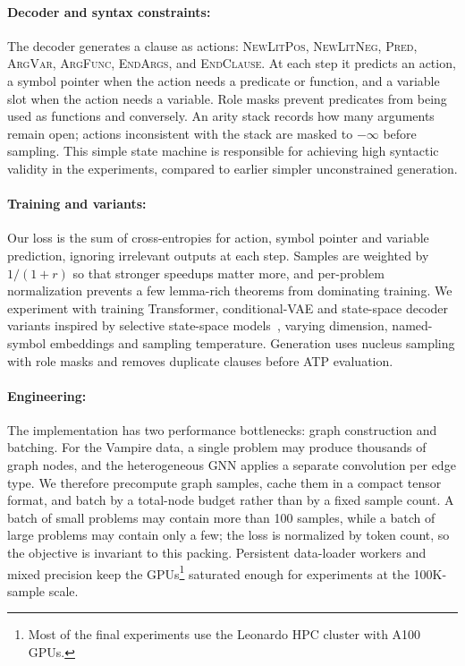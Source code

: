 \documentclass{easychair}
\newcommand{\Vampire}{Vampire\xspace}
\begin{document}
\paragraph{Decoder and syntax constraints:}
The decoder generates a clause as actions:
\textsc{NewLitPos}, \textsc{NewLitNeg}, \textsc{Pred},
\textsc{ArgVar}, \textsc{ArgFunc}, \textsc{EndArgs}, and
\textsc{EndClause}.  At each step it predicts an action, a symbol
pointer when the action needs a predicate or function, and a variable
slot when the action needs a variable.  Role masks prevent predicates
from being used as functions and conversely.  An arity stack records
how many arguments remain open; actions inconsistent with the stack are
masked to $-\infty$ before sampling.  This simple state machine is
responsible for achieving high syntactic validity in the experiments, compared to earlier simpler unconstrained generation.

\paragraph{Training and variants:}
Our loss is the sum of cross-entropies for action, symbol pointer and
variable prediction, ignoring irrelevant outputs at each step.  Samples
are weighted by $1/(1+r)$ so that stronger speedups matter more, and
per-problem normalization prevents a few lemma-rich theorems from
dominating training.  We experiment with training Transformer, conditional-VAE and
state-space decoder variants inspired by selective state-space models~\cite{Gu2023}, varying dimension, named-symbol
embeddings and sampling temperature.  Generation uses nucleus sampling
with role masks and removes duplicate clauses before ATP evaluation.

\paragraph{Engineering:}
The implementation has two performance bottlenecks: graph construction
and batching.  For the \Vampire data, a single problem may produce
thousands of graph nodes, and the heterogeneous GNN applies a separate
convolution per edge type.  We therefore precompute graph samples,
cache them in a compact tensor format, and batch by a total-node budget
rather than by a fixed sample count.  A batch of small problems may
contain more than 100 samples, while a batch of large problems may
contain only a few; the loss is normalized by token count, so the
objective is invariant to this packing.  Persistent data-loader workers
and mixed precision keep the GPUs\footnote{Most of the final experiments use the Leonardo HPC cluster with A100 GPUs.} saturated enough for experiments
at the 100K-sample scale.
\end{document}
